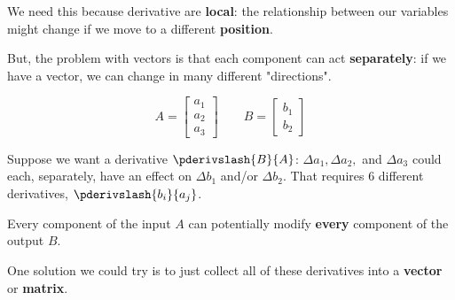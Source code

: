         We need this because derivative are \textbf{local}: the relationship between our variables might change if we move to a different \textbf{position}.
        
        But, the problem with vectors is that each component can act \textbf{separately}: if we have a vector, we can change in many different "directions".
        
        \begin{equation}
            A = 
            \begin{bmatrix}
                a_1 \\ a_2 \\ a_3
            \end{bmatrix}
            \qquad
            B = 
            \begin{bmatrix}
                b_1 \\ b_2
            \end{bmatrix}
        \end{equation}
        
        \miniex Suppose we want a derivative $\pderivslash{B}{A}$: $\Delta a_1, \Delta a_2,$ and $\Delta a_3$ could each, separately, have an effect on $\Delta b_1$ and/or $\Delta b_2$. That requires 6 different derivatives, $\pderivslash{b_i}{a_j}$.
        
        Every component of the input $A$ can potentially modify \textbf{every} component of the output $B$. 
        
        One solution we could try is to just collect all of these derivatives into a \textbf{vector} or \textbf{matrix}.\\
        
